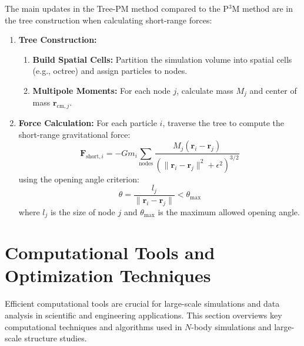 The main updates in the Tree-PM method compared to the P$^3$M method are in the tree construction when calculating short-range forces:
\begin{enumerate}
    \item \textbf{Tree Construction:}
    \begin{enumerate}[label={(\alph*)}]
        \item \textbf{Build Spatial Cells:}
        Partition the simulation volume into spatial cells (e.g., octree) and assign particles to nodes.
        \item \textbf{Multipole Moments:}
        For each node $j$, calculate mass $M_j$ and center of mass $\mathbf{r}_{\text{cm},j}$.
    \end{enumerate}
    \item \textbf{Force Calculation:}
    For each particle $i$, traverse the tree to compute the short-range gravitational force:
        \[
        \mathbf{F}_{\text{short},i} = -G m_i \sum_{\text{nodes}} \frac{M_j (\mathbf{r}_i - \mathbf{r}_j)}{(\|\mathbf{r}_i - \mathbf{r}_j\|^2 + \epsilon^2)^{3/2}}
        \]
        using the opening angle criterion:
        \[
        \theta = \frac{l_j}{\|\mathbf{r}_i - \mathbf{r}_j\|} < \theta_{\text{max}}
        \]
        where $l_j$ is the size of node $j$ and $\theta_{\text{max}}$ is the maximum allowed opening angle.
\end{enumerate}

\section{Computational Tools and Optimization Techniques}
Efficient computational tools are crucial for large-scale simulations and data analysis in scientific and engineering applications. This section overviews key computational techniques and algorithms used in $N$-body simulations and large-scale structure studies.

